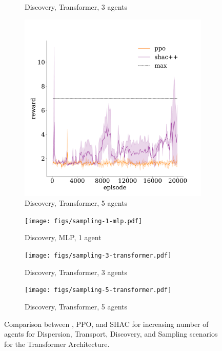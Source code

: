 \begin{figure}[!t]
\begin{subfigure}[b]{0.30\textwidth}
        \caption{Discovery, Transformer, 3 agents}
        \label{fig:discovery-transformer-3}
    \end{subfigure}
    \begin{subfigure}[b]{0.30\textwidth}
        \includegraphics[width=\textwidth]{figs/discovery-5-transformer.pdf}
        \caption{Discovery, Transformer, 5 agents}
        \label{fig:discovery-transformer-5}
    \end{subfigure}

    \begin{subfigure}[b]{0.30\textwidth}
        \texttt{[image: figs/sampling-1-mlp.pdf]}
        \caption{Discovery, MLP, 1 agent}
        \label{fig:sampling-mlp-1}
    \end{subfigure}
    \begin{subfigure}[b]{0.30\textwidth}
        \texttt{[image: figs/sampling-3-transformer.pdf]}
        \caption{Discovery, Transformer, 3 agents}
        \label{fig:sampling-transformer-3}
    \end{subfigure}
    \begin{subfigure}[b]{0.30\textwidth}
        \texttt{[image: figs/sampling-5-transformer.pdf]}
        \caption{Discovery, Transformer, 5 agents}
        \label{fig:sampling-transformer-5}
    \end{subfigure}

    \caption{Comparison between \fname{}, PPO, and SHAC for increasing number of agents for Dispersion, Transport, Discovery, and Sampling scenarios for the Transformer Architecture.}
    \label{fig:experiments}
\end{figure}

